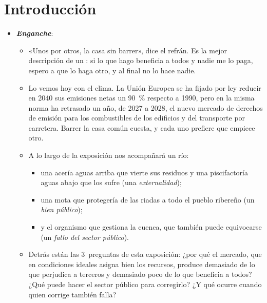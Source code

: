 \documentclass[11pt]{article}
\begin{document}
\tceetitulo

\section*{Introducción}

\begin{itemize}
\item \textbf{\emph{Enganche}}:
  \begin{itemize}
  \item «Unos por otros, la casa sin barrer», dice el refrán. Es la mejor descripción de un : si lo que hago beneficia a todos y nadie me lo paga, espero a que lo haga otro, y al final no lo hace nadie.
  \item Lo vemos hoy con el clima. La Unión Europea se ha fijado por ley reducir en 2040 sus emisiones netas un 90~\% respecto a 1990, pero en la misma norma ha retrasado un año, de 2027 a 2028, el nuevo mercado de derechos de emisión para los combustibles de los edificios y del transporte por carretera\nocite{UE2026Reglamento667}. Barrer la casa común cuesta, y cada uno prefiere que empiece otro.
  \item A lo largo de la exposición nos acompañará un río:
    \begin{itemize}
    \item una acería aguas arriba que vierte sus residuos y una piscifactoría aguas abajo que los sufre (una \emph{externalidad});
    \item una mota que protegería de las riadas a todo el pueblo ribereño (un \emph{bien público});
    \item y el organismo que gestiona la cuenca, que también puede equivocarse (un \emph{fallo del sector público}).
    \end{itemize}
  \item Detrás están las 3~preguntas de esta exposición: ¿por qué el mercado, que en condiciones ideales asigna bien los recursos, produce demasiado de lo que perjudica a terceros y demasiado poco de lo que beneficia a todos? ¿Qué puede hacer el sector público para corregirlo? ¿Y qué ocurre cuando quien corrige también falla?
  \end{itemize}


\end{itemize}
\end{document}
